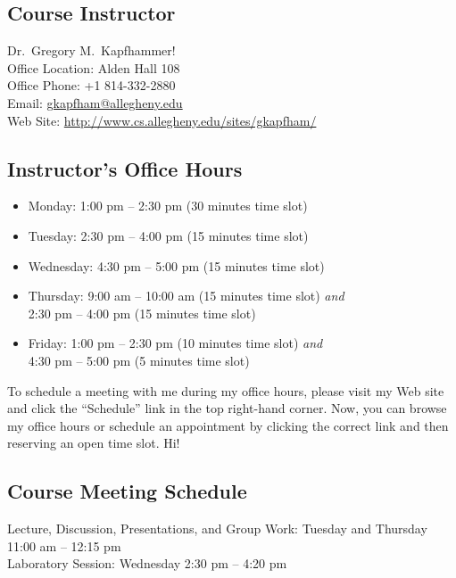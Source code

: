 



\subsection*{Course Instructor}
Dr.\ Gregory M.\ Kapfhammer! \\  
\noindent Office Location: Alden Hall 108 \\
\noindent Office Phone: +1 814-332-2880 \\
\noindent Email: \url{gkapfham@allegheny.edu} \\
\noindent Web Site: \url{http://www.cs.allegheny.edu/sites/gkapfham/}

\subsection*{Instructor's Office Hours}

\begin{itemize}
	\itemsep 0em
	\item Monday: 1:00 pm -- 2:30 pm (30 minutes time slot)
	\item Tuesday: 2:30 pm -- 4:00 pm (15 minutes time slot)
	\item Wednesday: 4:30 pm -- 5:00 pm (15 minutes time slot)
	\item Thursday: 9:00 am -- 10:00 am (15 minutes time slot) {\em and} \\ \hspace*{.69in} 2:30 pm -- 4:00 pm (15 minutes time slot)
	\item Friday: 1:00 pm -- 2:30 pm (10 minutes time slot) {\em and} \\ \hspace*{.49in} 4:30 pm -- 5:00 pm (5 minutes time slot)
\end{itemize}

\noindent
To schedule a meeting with me during my office hours, please visit my Web site and click the ``Schedule'' link in the
top right-hand corner. Now, you can browse my office hours or schedule an appointment by clicking the correct link and
then reserving an open time slot. Hi!

\subsection*{Course Meeting Schedule}

Lecture, Discussion, Presentations, and Group Work: Tuesday and Thursday 11:00 am -- 12:15 pm \\
Laboratory Session: Wednesday 2:30 pm -- 4:20 pm

